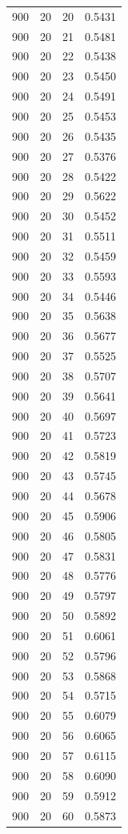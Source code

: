 \begin{longtable}{rrrr}
  900 & 20 & 20 & 0.5431 \\
  900 & 20 & 21 & 0.5481 \\
  900 & 20 & 22 & 0.5438 \\
  900 & 20 & 23 & 0.5450 \\
  900 & 20 & 24 & 0.5491 \\
  900 & 20 & 25 & 0.5453 \\
  900 & 20 & 26 & 0.5435 \\
  900 & 20 & 27 & 0.5376 \\
  900 & 20 & 28 & 0.5422 \\
  900 & 20 & 29 & 0.5622 \\
  900 & 20 & 30 & 0.5452 \\
  900 & 20 & 31 & 0.5511 \\
  900 & 20 & 32 & 0.5459 \\
  900 & 20 & 33 & 0.5593 \\
  900 & 20 & 34 & 0.5446 \\
  900 & 20 & 35 & 0.5638 \\
  900 & 20 & 36 & 0.5677 \\
  900 & 20 & 37 & 0.5525 \\
  900 & 20 & 38 & 0.5707 \\
  900 & 20 & 39 & 0.5641 \\
  900 & 20 & 40 & 0.5697 \\
  900 & 20 & 41 & 0.5723 \\
  900 & 20 & 42 & 0.5819 \\
  900 & 20 & 43 & 0.5745 \\
  900 & 20 & 44 & 0.5678 \\
  900 & 20 & 45 & 0.5906 \\
  900 & 20 & 46 & 0.5805 \\
  900 & 20 & 47 & 0.5831 \\
  900 & 20 & 48 & 0.5776 \\
  900 & 20 & 49 & 0.5797 \\
  900 & 20 & 50 & 0.5892 \\
  900 & 20 & 51 & 0.6061 \\
  900 & 20 & 52 & 0.5796 \\
  900 & 20 & 53 & 0.5868 \\
  900 & 20 & 54 & 0.5715 \\
  900 & 20 & 55 & 0.6079 \\
  900 & 20 & 56 & 0.6065 \\
  900 & 20 & 57 & 0.6115 \\
  900 & 20 & 58 & 0.6090 \\
  900 & 20 & 59 & 0.5912 \\
  900 & 20 & 60 & 0.5873 \\
\end{longtable}
